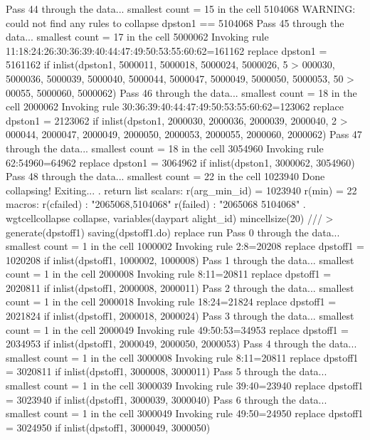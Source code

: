 Pass 44 through the data...
  smallest count = 15 in the cell      5104068
  WARNING: could not find any rules to collapse dpston1 == 5104068
Pass 45 through the data...
  smallest count = 17 in the cell      5000062
  Invoking rule 11:18:24:26:30:36:39:40:44:47:49:50:53:55:60:62=161162
  replace dpston1 = 5161162 if inlist(dpston1, 5000011, 5000018, 5000024, 5000026, 5
> 000030, 5000036, 5000039, 5000040, 5000044, 5000047, 5000049, 5000050, 5000053, 50
> 00055, 5000060, 5000062)
Pass 46 through the data...
  smallest count = 18 in the cell      2000062
  Invoking rule 30:36:39:40:44:47:49:50:53:55:60:62=123062
  replace dpston1 = 2123062 if inlist(dpston1, 2000030, 2000036, 2000039, 2000040, 2
> 000044, 2000047, 2000049, 2000050, 2000053, 2000055, 2000060, 2000062)
Pass 47 through the data...
  smallest count = 18 in the cell      3054960
  Invoking rule 62:54960=64962
  replace dpston1 = 3064962 if inlist(dpston1, 3000062, 3054960)
Pass 48 through the data...
  smallest count = 22 in the cell      1023940
  Done collapsing! Exiting...
{\smallskip}
. return list
{\smallskip}
scalars:
         r(arg_min_id) =  1023940
                r(min) =  22
{\smallskip}
macros:
            r(cfailed) : "2065068,5104068"
             r(failed) : "2065068 5104068"
{\smallskip}
. wgtcellcollapse collapse, variables(daypart alight_id) mincellsize(20) ///
>         generate(dpstoff1) saving(dpstoff1.do) replace run
Pass 0 through the data...
  smallest count = 1 in the cell      1000002
  Invoking rule 2:8=20208
  replace dpstoff1 = 1020208 if inlist(dpstoff1, 1000002, 1000008)
Pass 1 through the data...
  smallest count = 1 in the cell      2000008
  Invoking rule 8:11=20811
  replace dpstoff1 = 2020811 if inlist(dpstoff1, 2000008, 2000011)
Pass 2 through the data...
  smallest count = 1 in the cell      2000018
  Invoking rule 18:24=21824
  replace dpstoff1 = 2021824 if inlist(dpstoff1, 2000018, 2000024)
Pass 3 through the data...
  smallest count = 1 in the cell      2000049
  Invoking rule 49:50:53=34953
  replace dpstoff1 = 2034953 if inlist(dpstoff1, 2000049, 2000050, 2000053)
Pass 4 through the data...
  smallest count = 1 in the cell      3000008
  Invoking rule 8:11=20811
  replace dpstoff1 = 3020811 if inlist(dpstoff1, 3000008, 3000011)
Pass 5 through the data...
  smallest count = 1 in the cell      3000039
  Invoking rule 39:40=23940
  replace dpstoff1 = 3023940 if inlist(dpstoff1, 3000039, 3000040)
Pass 6 through the data...
  smallest count = 1 in the cell      3000049
  Invoking rule 49:50=24950
  replace dpstoff1 = 3024950 if inlist(dpstoff1, 3000049, 3000050)
